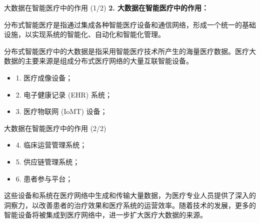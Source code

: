 \documentclass{beamer}
\begin{document}
\begin{frame}{大数据在智能医疗中的作用 (1/2)}
    \textbf{2. 大数据在智能医疗中的作用：}
    
    \vspace{0.3cm}
    分布式智能医疗是指通过集成各种智能医疗设备和通信网络，形成一个统一的基础设施，以实现系统的智能化、自动化和智能化管理。

    \vspace{0.3cm}
    分布式智能医疗中的大数据是指采用智能医疗技术所产生的海量医疗数据。医疗大数据的主要来源是组成分布式医疗网络的大量互联智能设备。
    
    \vspace{0.3cm}
    \begin{itemize}
        \item 1. 医疗成像设备；
        \item 2. 电子健康记录 (EHR) 系统；
        \item 3. 医疗物联网 (IoMT) 设备；
    \end{itemize}
\end{frame}
\begin{frame}{大数据在智能医疗中的作用 (2/2)}
    \begin{itemize}
        \item 4. 临床运营管理系统；
        \item 5. 供应链管理系统；
        \item 6. 患者参与平台；
    \end{itemize}
    
    \vspace{0.3cm}
    这些设备和系统在医疗网络中生成和传输大量数据，为医疗专业人员提供了深入的洞察力，以改善患者的治疗效果和医疗系统的运营效率。随着技术的发展，更多的智能设备将被集成到医疗网络中，进一步扩大医疗大数据的来源。
\end{frame}


    
    
    
    
\end{document}
